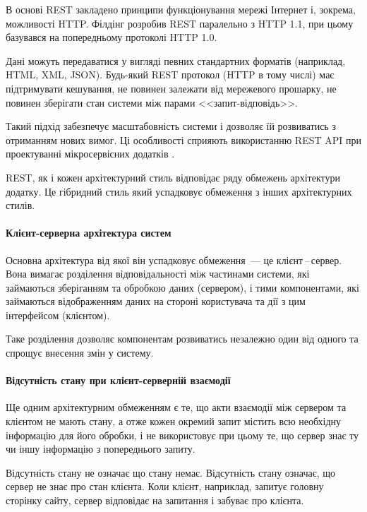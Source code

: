 В основі REST закладено принципи функціонування мережі Інтернет і, зокрема, можливості HTTP. Філдінг розробив REST паралельно з HTTP 1.1, при цьому базувався на попередньому протоколі HTTP 1.0.

Дані можуть передаватися у вигляді певних стандартних форматів (наприклад, HTML, XML, JSON). Будь-який REST протокол (HTTP в тому числі) має підтримувати кешування, не повинен залежати від мережевого прошарку, не повинен зберігати стан системи між парами <<запит-відповідь>>\cite{кучер2018мікросервісна}. 

Такий підхід забезпечує масштабовність системи і дозволяє їй розвиватись з отриманням нових вимог. Ці особливості сприяють використанню REST API при проектуванні мікросервісних додатків \cite{кучер2018мікросервісна}.

REST, як і кожен архітектурний стиль відповідає ряду обмежень архітектури додатку. Це гібридний стиль який успадковує обмеження з інших архітектурних стилів.

\paragraph{Клієнт-серверна архітектура систем}

Основна архітектура від якої він успадковує обмеження~--- це клієнт\,--\,сервер. Вона вимагає розділення відповідальності між частинами системи, які займаються зберіганням та обробкою даних (сервером), і тими компонентами, які займаються відображенням даних на стороні користувача та дії з цим інтерфейсом (клієнтом). 

Таке розділення дозволяє компонентам розвиватись незалежно один від одного та спрощує внесення змін у систему.

\paragraph{Відсутність стану при клієнт-серверній взаємодії}

Ще одним архітектурним обмеженням є те, що акти взаємодії між сервером та клієнтом не мають стану, а отже кожен окремий запит містить всю необхідну інформацію для його обробки, і не використовує при цьому те, що сервер знає ту чи іншу інформацію з попереднього запиту.

Відсутність стану не означає що стану немає. Відсутність стану означає, що сервер не знає про стан клієнта. Коли клієнт, наприклад, запитує головну сторінку сайту, сервер відповідає на запитання і забуває про клієнта. 

